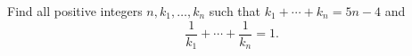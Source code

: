Find all positive integers $n, k_1, \dots, k_n$ such that
$k_1 + \cdots + k_n = 5n-4$ and
\[
\frac{1}{k_1} + \cdots + \frac{1}{k_n} = 1.
\]
